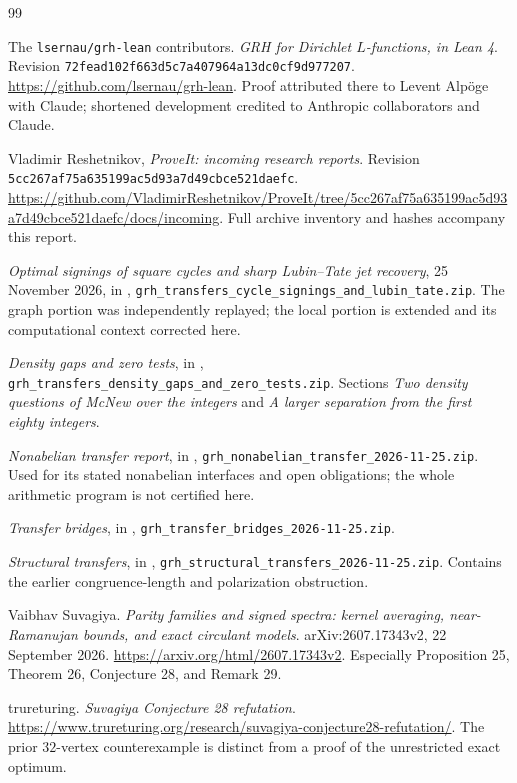 \begin{thebibliography}{99}
\small
\raggedright
{}
The \texttt{lsernau/grh-lean} contributors.
\emph{GRH for Dirichlet \(L\)-functions, in Lean 4}.
Revision \texttt{72fead102f663d5c7a407964a13dc0cf9d977207}.
\url{https://github.com/lsernau/grh-lean}.
Proof attributed there to Levent Alp\"oge with Claude; shortened development
credited to Anthropic collaborators and Claude.

Vladimir Reshetnikov, \emph{ProveIt: incoming research reports}.
Revision \texttt{5cc267af75a635199ac5d93a7d49cbce521daefc}.
\url{https://github.com/VladimirReshetnikov/ProveIt/tree/5cc267af75a635199ac5d93a7d49cbce521daefc/docs/incoming}.
Full archive inventory and hashes accompany this report.

\emph{Optimal signings of square cycles and sharp Lubin--Tate jet recovery},
25 November 2026, in \cite{Incoming},
\nolinkurl{grh_transfers_cycle_signings_and_lubin_tate.zip}.
The graph portion was independently replayed; the local portion is
extended and its computational context corrected here.

\emph{Density gaps and zero tests}, in \cite{Incoming},
\nolinkurl{grh_transfers_density_gaps_and_zero_tests.zip}.
Sections \emph{Two density questions of McNew over the integers} and
\emph{A larger separation from the first eighty integers}.

\emph{Nonabelian transfer report}, in \cite{Incoming},
\nolinkurl{grh_nonabelian_transfer_2026-11-25.zip}.
Used for its stated nonabelian interfaces and open obligations;
the whole arithmetic program is not certified here.

\emph{Transfer bridges}, in \cite{Incoming},
\nolinkurl{grh_transfer_bridges_2026-11-25.zip}.

\emph{Structural transfers}, in \cite{Incoming},
\nolinkurl{grh_structural_transfers_2026-11-25.zip}.
Contains the earlier congruence-length and polarization obstruction.

Vaibhav Suvagiya.
\emph{Parity families and signed spectra: kernel averaging,
near-Ramanujan bounds, and exact circulant models}.
arXiv:2607.17343v2, 22 September 2026.
\url{https://arxiv.org/html/2607.17343v2}.
Especially Proposition 25, Theorem 26, Conjecture 28, and Remark 29.

trureturing.
\emph{Suvagiya Conjecture 28 refutation}.
\url{https://www.trureturing.org/research/suvagiya-conjecture28-refutation/}.
The prior \(32\)-vertex counterexample is distinct from a proof of the
unrestricted exact optimum.


\end{thebibliography}
